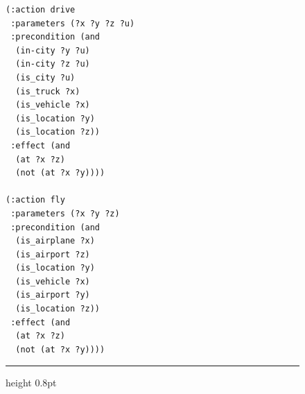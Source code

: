 \begin{figure}[t]
\begin{minipage}[t]{0.33\textwidth}
\begin{lstlisting}
(:action drive
 :parameters (?x ?y ?z ?u)
 :precondition (and
  (in-city ?y ?u)
  (in-city ?z ?u)
  (is_city ?u)
  (is_truck ?x)
  (is_vehicle ?x)
  (is_location ?y)
  (is_location ?z))
 :effect (and
  (at ?x ?z)
  (not (at ?x ?y))))

(:action fly
 :parameters (?x ?y ?z)
 :precondition (and
  (is_airplane ?x)
  (is_airport ?z)
  (is_location ?y)
  (is_vehicle ?x)
  (is_airport ?y)
  (is_location ?z))
 :effect (and
  (at ?x ?z)
  (not (at ?x ?y))))
\end{lstlisting}
\end{minipage}%
\par\vspace{0.6em}
\hrule height 0.8pt
\captionsetup{position=bottom}
\label{lst:logistics_full}
\end{figure}
\endgroup

